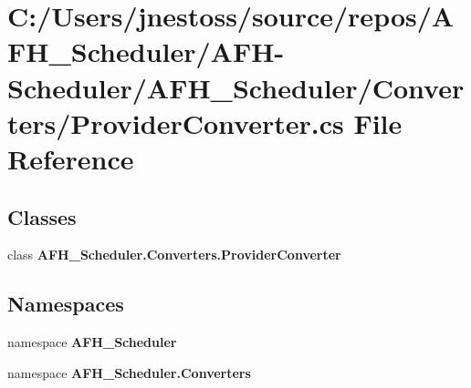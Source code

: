 \section{C\+:/\+Users/jnestoss/source/repos/\+A\+F\+H\+\_\+\+Scheduler/\+A\+F\+H-\/\+Scheduler/\+A\+F\+H\+\_\+\+Scheduler/\+Converters/\+Provider\+Converter.cs File Reference}
\label{_provider_converter_8cs}
\subsection*{Classes}
\begin{DoxyCompactItemize}
\item 
class \textbf{ A\+F\+H\+\_\+\+Scheduler.\+Converters.\+Provider\+Converter}
\end{DoxyCompactItemize}
\subsection*{Namespaces}
\begin{DoxyCompactItemize}
\item 
namespace \textbf{ A\+F\+H\+\_\+\+Scheduler}
\item 
namespace \textbf{ A\+F\+H\+\_\+\+Scheduler.\+Converters}
\end{DoxyCompactItemize}
